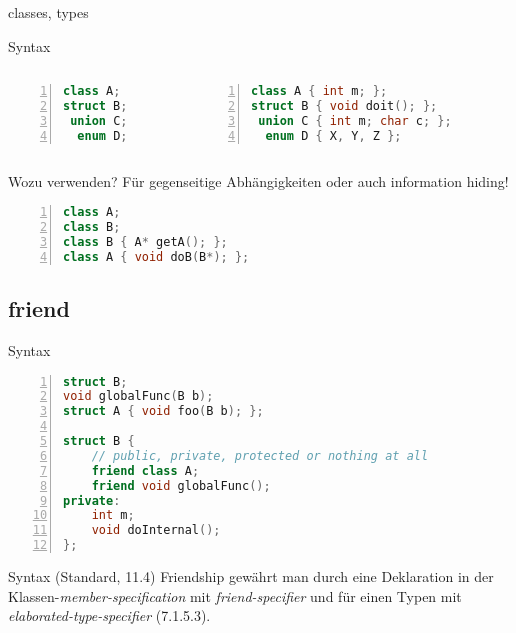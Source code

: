 \begin{frame}[fragile]{classes, types}
	\begin{block}{Syntax}
		\begin{columns}[t]
			\begin{lstlisting}[language=C++, basicstyle=\footnotesize, numbers=left, numberstyle=\tiny\color{gray}, tabsize=6, xleftmargin=2em]
 class A;
struct B;
 union C;
  enum D;
			\end{lstlisting}
			
			\begin{lstlisting}[language=C++, basicstyle=\footnotesize, numbers=left, numberstyle=\tiny\color{gray}, tabsize=6, xleftmargin=2em]
 class A { int m; };
struct B { void doit(); };
 union C { int m; char c; };
  enum D { X, Y, Z };
			\end{lstlisting}
		\end{columns}
	\end{block}
	
	\pause
	
	Wozu verwenden?
	\pause
	Für gegenseitige Abhängigkeiten oder auch information hiding!
	\begin{lstlisting}[language=C++, basicstyle=\footnotesize, numbers=left, numberstyle=\tiny\color{gray}, tabsize=6, xleftmargin=2em]
class A;
class B;
class B { A* getA(); };
class A { void doB(B*); };
	\end{lstlisting}
\end{frame}


\subsection{friend}

\begin{frame}[fragile]{Syntax}
	\begin{lstlisting}[language=C++, basicstyle=\footnotesize, numbers=left, numberstyle=\tiny\color{gray}, tabsize=6, xleftmargin=2em]
struct B;
void globalFunc(B b);
struct A { void foo(B b); };

struct B {
	// public, private, protected or nothing at all
	friend class A;
	friend void globalFunc();
private:
	int m;
	void doInternal();
};
	\end{lstlisting}
	
	\pause
	
	\begin{block}{Syntax (Standard, 11.4)}
		Friendship gewährt man durch eine Deklaration in der Klassen-\emph{member-specification} mit \emph{friend-specifier} und für einen Typen mit \emph{elaborated-type-specifier} (7.1.5.3).
	\end{block}
\end{frame}

